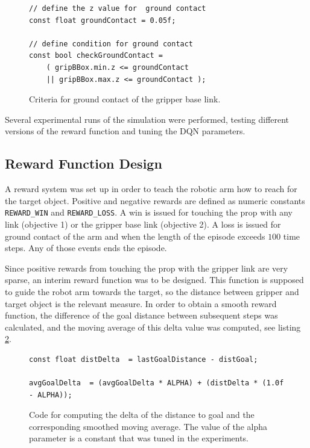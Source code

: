\documentclass[11pt, onecolumn, oneside, reqno]{amsart}
\begin{document}
\begin{figure}[thpb]
\centering
\begin{lstlisting}
// define the z value for  ground contact
const float groundContact = 0.05f;

// define condition for ground contact
const bool checkGroundContact =
	( gripBBox.min.z <= groundContact
	|| gripBBox.max.z <= groundContact );
\end{lstlisting}
\caption{Criteria for ground contact of the gripper base link.}
\label{fig:listing_ground_contact}
\end{figure}

Several experimental runs of the simulation were performed, testing different versions of the reward function and tuning the DQN parameters.

\subsection{Reward Function Design}
\label{sec:reward-function-design}
A reward system was set up in order to teach the robotic arm how to reach for the target object. Positive and negative rewards are defined as numeric constants \texttt{REWARD\_WIN} and \texttt{REWARD\_LOSS}. A win is issued for touching the prop with any link (objective 1) or the gripper base link (objective 2). A loss is issued for ground contact of the arm and when the length of the episode exceeds $100$ time steps. Any of those events ends the episode.

Since positive rewards from touching the prop with the gripper link are very sparse, an interim reward function was to be designed. This function is supposed to guide the robot arm towards the target, so the distance between gripper and target object is the relevant measure. In order to obtain a smooth reward function, the difference of the goal distance between subsequent steps was calculated, and the moving average of this delta value was computed, see listing \ref{fig:source_smoothed_moving_average}. 
\begin{figure}[htpb]
\centering
\begin{lstlisting}
const float distDelta  = lastGoalDistance - distGoal;

avgGoalDelta  = (avgGoalDelta * ALPHA) + (distDelta * (1.0f - ALPHA));
\end{lstlisting}
\caption{Code for computing the delta of the distance to goal and the corresponding smoothed moving average. The value of the alpha parameter is a constant that was tuned in the experiments.}
\label{fig:source_smoothed_moving_average}
\end{figure}
\end{document}
